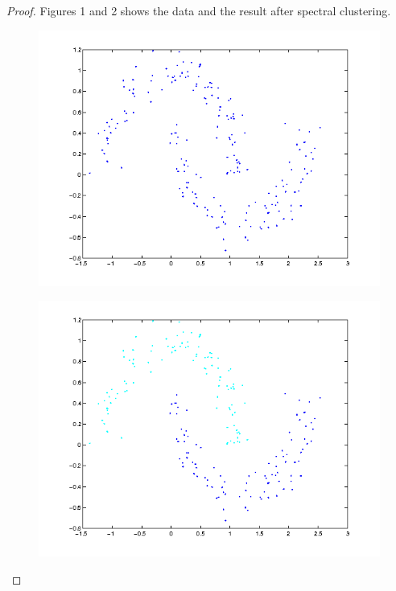\documentclass{article} %
\theoremstyle{plain}
\numberwithin{equation}{section} %
\numberwithin{figure}{section} %
\numberwithin{table}{section} %
\begin{document}
\begin{proof}
    Figures 1 and 2 shows the data and the result after spectral clustering. 
    \begin{figure}[ht!]
        \centering
        \begin{minipage}{.5\textwidth}
            \centering
            \includegraphics[width=\linewidth]{1.png}
            \label{fig:1}
        \end{minipage}%
        \begin{minipage}{.5\textwidth}
            \centering
            \includegraphics[width=\linewidth]{3.png}
            \label{fig:2}
        \end{minipage}
    \end{figure}
    

\end{proof}
\end{document}

